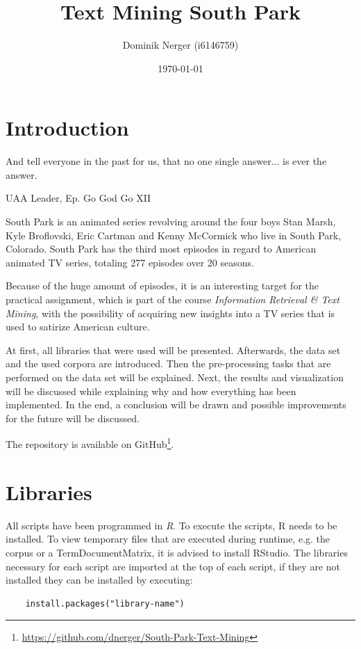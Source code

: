 \documentclass[10pt,a4paper]{article}
\author{Dominik Nerger (i6146759)}
\title{Text Mining South Park}
\date{\today}
\begin{document}
	\maketitle
	
	\tableofcontents
	\newpage
	\clearpage
	\setcounter{page}{1}
	\section{Introduction}
	\epigraph{ And tell everyone in the past for us, that no one single answer... is ever the answer. }{UAA Leader, Ep. Go God Go XII}

	South Park is an animated series revolving around the four boys Stan Marsh, Kyle Broflovski, Eric Cartman and Kenny McCormick who live in South Park, Colorado. South Park has the third most episodes in regard to American animated TV series, totaling 277 episodes over 20 seasons. 
	
	Because of the huge amount of episodes, it is an interesting target for the practical assignment, which is part of the course \textit{Information Retrieval \& Text Mining}, with the possibility of acquiring new insights into a TV series that is used to satirize American culture. 
	
	At first, all libraries that were used will be presented. Afterwards, the data set and the used corpora are introduced.  Then the pre-processing tasks that are performed on the data set will be explained. Next, the results and visualization will be discussed while explaining why and how everything has been implemented.
	In the end, a conclusion will be drawn and possible improvements for the future will be discussed.	
	
	
	The repository is available on GitHub\footnote{\url{https://github.com/dnerger/South-Park-Text-Mining}}.
	\section{Libraries}
	
	All scripts have been programmed in \textit{R}. To execute the scripts, R needs to be installed. To view temporary files that are executed during runtime, e.g. the corpus or a TermDocumentMatrix, it is advised to install RStudio. The libraries necessary for each script are imported at the top of each script, if they are not installed they can be installed by executing:
	
	\begin{verbatim}
	install.packages("library-name")
	\end{verbatim}
	
\end{document}
